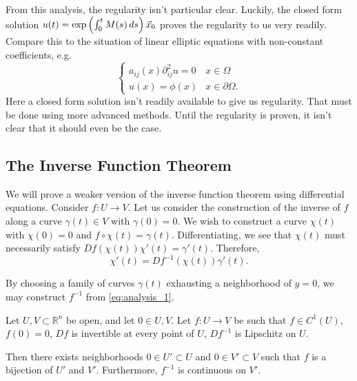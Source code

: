 From this analysis, the regularity isn't particular clear. Luckily, the closed form solution \(u(t) =  \exp\left( \int_0^t M(s) \, ds \right) \vec x_0\) proves the regularity to us very readily. Compare this to the situation of linear elliptic equations with non-constant coefficients, e.g.
\begin{equation}
\begin{cases}
a_{ij}(x)  \partial^2_{ij}u = 0 & x \in\Omega\\
u (x) = \phi(x) & x \in\partial \Omega.
\end{cases}
\end{equation}
Here a closed form solution isn't readily available to give us regularity. That must be done using more advanced methods.
Until the regularity is proven, it isn't clear that it should even be the case.

\subsection{The Inverse Function Theorem}

We will prove a weaker version of the inverse function theorem using differential equations. Consider $f: U \to V$. Let us consider the construction of the inverse of $f$ along a curve $\gamma(t) \in V$ with $\gamma(0) = 0$. We wish to construct a curve $\chi(t)$ with $\chi(0) = 0$ and $f\circ \chi (t) = \gamma(t)$. Differentiating, we see that $\chi(t)$ must necessarily satisfy $Df(\chi(t))\chi'(t) = \gamma'(t)$. Therefore, 
\begin{equation}\label{eq:analysis_1}
\chi'(t) = Df^{-1}(\chi(t)) \gamma'(t).
\end{equation}

By choosing a family of curves $\gamma(t)$ exhausting a neighborhood of $y=0$, we may construct $f^{-1}$ from \eqref{eq:analysis_1}.

\begin{proposition}
Let $U, V \subset \mathbb R^n$ be open, and let $0\in U, V$. Let $f: U \to V$ be such that $f\in C^1(U)$, $f(0) = 0$, $Df$ is invertible at every point of $U$, $Df^{-1}$ is Lipschitz on $U$.

Then there exists neighborhoods $0\in U' \subset U$ and $0\in V' \subset V$ such that $f$ is a bijection of $U'$ and $V'$. Furthermore, $f^{-1}$ is continuous on $V'$.
\end{proposition}

